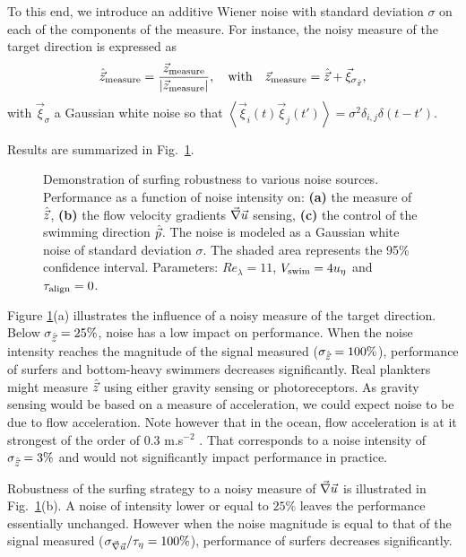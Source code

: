 To this end, we introduce an additive Wiener noise with standard deviation $\sigma$ on each of the components of the measure.
For instance, the noisy measure of the target direction is expressed as
\begin{equation}
	\stepcounter{equation}
	\label{eq:noise}
	\Direction_{\textrm{measure}} = \frac{\DirectionNN_{\textrm{measure}}}{\norm{\DirectionNN_{\textrm{measure}}}}, \quad \text{with} \quad \DirectionNN_{\textrm{measure}} = \Direction + \vec{\xi}_{\sigma_{\Direction}} \text{,}
\end{equation}
with $\vec{\xi}_{\sigma}$ a Gaussian white noise so that $\left\langle \vec{\xi}_i(t)\vec{\xi}_j(t') \right\rangle = \sigma^2 \delta_{i,j} \delta(t - t')$.

Results are summarized in Fig.~\ref{fig:surfing_noise}.
\begin{figure}%
	\centering
	
	\caption[Demonstration of surfing robustness to various noise sources.]{
		Demonstration of surfing robustness to various noise sources.
		Performance as a function of noise intensity on:
		\textbf{(a)} the measure of $\hat{\vec{z}}$,
		\textbf{(b)} the flow velocity gradients $\vec{\nabla} \vec{u}$ sensing,
		\textbf{(c)} the control of the swimming direction $\hat{\vec{p}}$.
		The noise is modeled as a Gaussian white noise of standard deviation $\sigma$.
		The shaded area represents the 95\% confidence interval.
		Parameters: $\mathit{Re}_{\lambda} = 11$, $V_{\mathrm{swim}} = 4 u_{\eta}$ and $\tau_{\mathrm{align}} = 0$.
	}
	\label{fig:surfing_noise}
\end{figure}
Figure \ref{fig:surfing_noise}(a) illustrates the influence of a noisy measure of the target direction. 
Below $\sigma_{\hat{\vec{z}}} = 25\%$, noise has a low impact on performance. 
When the noise intensity reaches the magnitude of the signal measured ($\sigma_{\hat{\vec{z}}} = 100\%$), performance of surfers and bottom-heavy swimmers decreases significantly.
Real plankters might measure $\hat{\vec{z}}$ using either gravity sensing or photoreceptors.
As gravity sensing would be based on a measure of acceleration, we could expect noise to be due to flow acceleration.
Note however that in the ocean, flow acceleration is at it strongest of the order of $0.3$ m.s$^{-2}$ \citep{fuchs2016seascape}. 
That corresponds to a noise intensity of $\sigma_{\hat{\vec{z}}} = 3\%$ and would not significantly impact performance in practice.

Robustness of the surfing strategy to a noisy measure of $\vec{\nabla} \vec{u}$ is illustrated in Fig.~\ref{fig:surfing_noise}(b).
A noise of intensity lower or equal to $25\%$ leaves the performance essentially unchanged. 
However when the noise magnitude is equal to that of the signal measured ($\sigma_{\vec{\nabla} \vec{u}}/\tau_{\eta} = 100\%$), performance of surfers decreases significantly.

